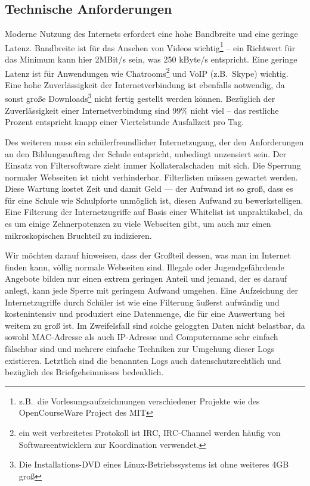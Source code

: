 \documentclass[10pt,a4paper,notitlepage]{scrartcl}
\newcommand{\gfo}{\grqq\ }
\newcommand{\gfu}{\glqq}
\begin{document}
\subsection{Technische Anforderungen}
\begin{multicols}{2}
Moderne Nutzung des Internets erfordert eine hohe Bandbreite und eine geringe Latenz. Bandbreite ist für das Ansehen von Videos wichtig\footnote{z.B.\ die Vorlesungsaufzeichnungen verschiedener Projekte wie des OpenCourseWare Project des MIT}	-- ein Richtwert für  das Minimum kann hier 2MBit/s sein, was 250 kByte/s entspricht. Eine geringe Latenz ist für Anwendungen wie Chatrooms\footnote{ein weit verbreitetes Protokoll ist IRC, IRC-Channel werden häufig von Softwareentwicklern zur Koordination verwendet.} und VoIP (z.B.\ Skype) wichtig. Eine hohe Zuverlässigkeit der Internetverbindung ist ebenfalls notwendig, da sonst große Downloads\footnote{Die Installations-DVD eines Linux-Betriebssystems ist ohne weiteres 4GB groß} nicht fertig gestellt werden können. Bezüglich der Zuverlässigkeit einer Internetverbindung sind 99\% nicht viel -- das restliche Prozent entspricht knapp einer Viertelstunde Ausfallzeit pro Tag.

Des weiteren muss ein schülerfreundlicher Internetzugang, der den Anforderungen an den Bildungsauftrag der Schule entspricht, unbedingt unzensiert sein. Der Einsatz von Filtersoftware zieht immer \gfu Kollateralschaden\gfo mit sich. Die Sperrung normaler Webseiten ist nicht verhinderbar.
Filterlisten müssen gewartet werden. Diese Wartung kostet Zeit und damit Geld --- der Aufwand ist so groß, dass es für eine Schule wie Schulpforte unmöglich ist, diesen Aufwand zu bewerkstelligen. Eine Filterung der Internetzugriffe auf Basis einer Whitelist ist unpraktikabel, da es um einige Zehnerpotenzen zu viele Webseiten gibt, um auch nur einen mikroskopischen Bruchteil zu indizieren.

Wir möchten darauf hinweisen, dass der Großteil dessen, was man im Internet finden kann, völlig normale Webseiten sind. Illegale oder Jugendgefährdende Angebote bilden nur einen extrem geringen Anteil und jemand, der es darauf anlegt, kann jede Sperre mit geringem Aufwand umgehen. Eine Aufzeichung der Internetzugriffe durch Schüler ist wie eine Filterung äußerst aufwändig und kostenintensiv und produziert eine Datenmenge, die für eine Auswertung bei weitem zu groß ist. Im Zweifelsfall sind solche geloggten Daten nicht belastbar, da sowohl MAC-Adresse als auch IP-Adresse und Computername sehr einfach fälschbar sind und mehrere einfache Techniken zur Umgehung dieser Logs existieren. Letztlich sind die benannten Logs auch datenschutzrechtlich und bezüglich des Briefgeheimnisses bedenklich.


\end{multicols}
\end{document}
